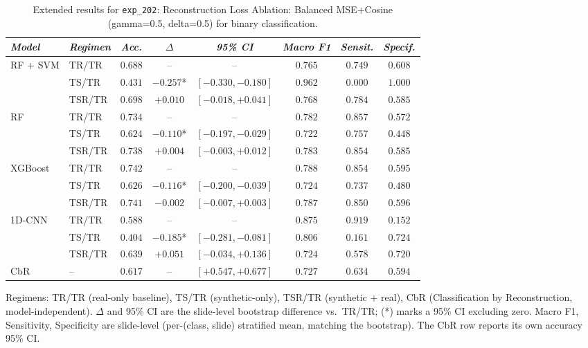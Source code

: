 \begin{table}[htp]
\centering
\scriptsize
\caption{Extended results for \texttt{exp\_202}: Reconstruction Loss Ablation: Balanced MSE+Cosine (gamma=0.5, delta=0.5) for binary classification.}
\label{tab:appendix_exp_202}
\begin{tabular*}{\textwidth}{@{\extracolsep{\fill}}llcccccc}
\toprule
\emph{Model} & \emph{Regimen} & \emph{Acc.} & \emph{$\Delta$} & \emph{95\% CI} & \emph{Macro F1} & \emph{Sensit.} & \emph{Specif.}\\
\midrule
\multirow{3}{*}{RF + SVM} & TR/TR & $0.688$ & -- & -- & $0.765$ & $0.749$ & $0.608$\\
 & TS/TR & $0.431$ & $-0.257$* & $[-0.330, -0.180]$ & $0.962$ & $0.000$ & $1.000$\\
 & TSR/TR & $0.698$ & $+0.010$ & $[-0.018, +0.041]$ & $0.768$ & $0.784$ & $0.585$\\
\midrule
\multirow{3}{*}{RF} & TR/TR & $0.734$ & -- & -- & $0.782$ & $0.857$ & $0.572$\\
 & TS/TR & $0.624$ & $-0.110$* & $[-0.197, -0.029]$ & $0.722$ & $0.757$ & $0.448$\\
 & TSR/TR & $0.738$ & $+0.004$ & $[-0.003, +0.012]$ & $0.783$ & $0.854$ & $0.585$\\
\midrule
\multirow{3}{*}{XGBoost} & TR/TR & $0.742$ & -- & -- & $0.788$ & $0.854$ & $0.595$\\
 & TS/TR & $0.626$ & $-0.116$* & $[-0.200, -0.039]$ & $0.724$ & $0.737$ & $0.480$\\
 & TSR/TR & $0.741$ & $-0.002$ & $[-0.007, +0.003]$ & $0.787$ & $0.850$ & $0.596$\\
\midrule
\multirow{3}{*}{1D-CNN} & TR/TR & $0.588$ & -- & -- & $0.875$ & $0.919$ & $0.152$\\
 & TS/TR & $0.404$ & $-0.185$* & $[-0.281, -0.081]$ & $0.806$ & $0.161$ & $0.724$\\
 & TSR/TR & $0.639$ & $+0.051$ & $[-0.034, +0.136]$ & $0.724$ & $0.578$ & $0.720$\\
\midrule
CbR & -- & $0.617$ & -- & $[+0.547, +0.677]$ & $0.727$ & $0.634$ & $0.594$\\
\bottomrule
\end{tabular*}
\small{Regimens: TR/TR (real-only baseline), TS/TR (synthetic-only), TSR/TR (synthetic + real), CbR (Classification by Reconstruction, model-independent). $\Delta$ and 95\% CI are the slide-level bootstrap difference vs.\ TR/TR; (*) marks a 95\% CI excluding zero. Macro F1, Sensitivity, Specificity are slide-level (per-(class, slide) stratified mean, matching the bootstrap). The CbR row reports its own accuracy 95\% CI.}
\end{table}

